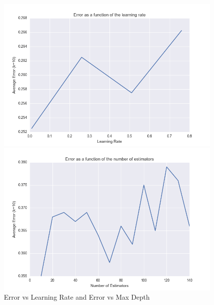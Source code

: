 \documentclass{article} %
\begin{document}
\begin{figure}[!ht]
\begin{center}
\caption{Error vs Learning Rate and Error vs Max Depth}
\begin{minipage}[b]{0.45\linewidth}
	\includegraphics[scale=0.35]{ErrorVsLearningRate-AdaBoostRandomForest.png}
\end{minipage}
\quad
\begin{minipage}[b]{0.45\linewidth}
	\includegraphics[scale=0.35]{AdaBoostErrorvsEstimators.png}
\end{minipage}
\end{center}
\end{figure}
\end{document}
